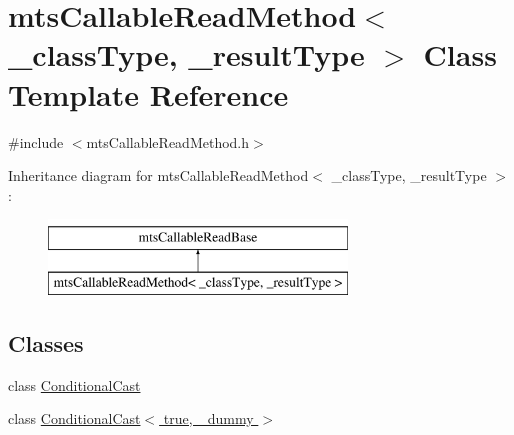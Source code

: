 \hypertarget{classmts_callable_read_method}{}\section{mts\+Callable\+Read\+Method$<$ \+\_\+class\+Type, \+\_\+result\+Type $>$ Class Template Reference}
\label{classmts_callable_read_method}


{\ttfamily \#include $<$mts\+Callable\+Read\+Method.\+h$>$}

Inheritance diagram for mts\+Callable\+Read\+Method$<$ \+\_\+class\+Type, \+\_\+result\+Type $>$\+:\begin{figure}[H]
\begin{center}
\leavevmode
\includegraphics[height=2.000000cm]{d9/d8a/classmts_callable_read_method}
\end{center}
\end{figure}
\subsection*{Classes}
\begin{DoxyCompactItemize}
\item 
class \hyperlink{classmts_callable_read_method_1_1_conditional_cast}{Conditional\+Cast}
\item 
class \hyperlink{classmts_callable_read_method_1_1_conditional_cast_3_01true_00_01__dummy_01_4}{Conditional\+Cast$<$ true, \+\_\+dummy $>$}
\end{DoxyCompactItemize}

